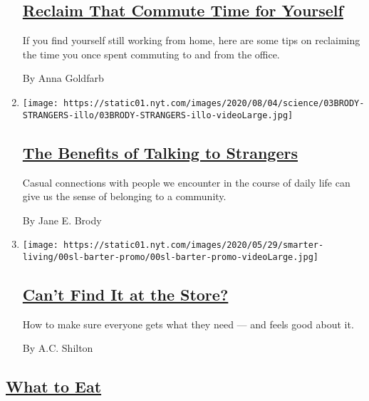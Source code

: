 \begin{enumerate}
  \hypertarget{reclaim-that-commute-time-for-yourself}{%
  \subsection{\texorpdfstring{\href{/interactive/2020/08/03/burst/reclaim-commute-time.html}{Reclaim
  That Commute Time for
  Yourself}}{Reclaim That Commute Time for Yourself}}\label{reclaim-that-commute-time-for-yourself}}

  If you find yourself still working from home, here are some tips on
  reclaiming the time you once spent commuting to and from the office.

  By Anna Goldfarb
\item
  \texttt{[image: https://static01.nyt.com/images/2020/08/04/science/03BRODY-STRANGERS-illo/03BRODY-STRANGERS-illo-videoLarge.jpg]}

  \hypertarget{the-benefits-of-talking-to-strangers}{%
  \subsection{\texorpdfstring{\href{/2020/08/03/well/family/the-benefits-of-talking-to-strangers.html}{The
  Benefits of Talking to
  Strangers}}{The Benefits of Talking to Strangers}}\label{the-benefits-of-talking-to-strangers}}

  Casual connections with people we encounter in the course of daily
  life can give us the sense of belonging to a community.

  By Jane E. Brody
\item
  \texttt{[image: https://static01.nyt.com/images/2020/05/29/smarter-living/00sl-barter-promo/00sl-barter-promo-videoLarge.jpg]}

  \hypertarget{cant-find-it-at-the-store}{%
  \subsection{\texorpdfstring{\href{/2020/08/03/smarter-living/coronavirus-how-to-trade-barter.html}{Can't
  Find It at the
  Store?}}{Can't Find It at the Store?}}\label{cant-find-it-at-the-store}}

  How to make sure everyone gets what they need --- and feels good about
  it.

  By A.C. Shilton
\end{enumerate}

\hypertarget{what-to-eat}{%
\subsection{\texorpdfstring{\href{/spotlight/what-to-eat}{What to
Eat}}{What to Eat}}\label{what-to-eat}}

